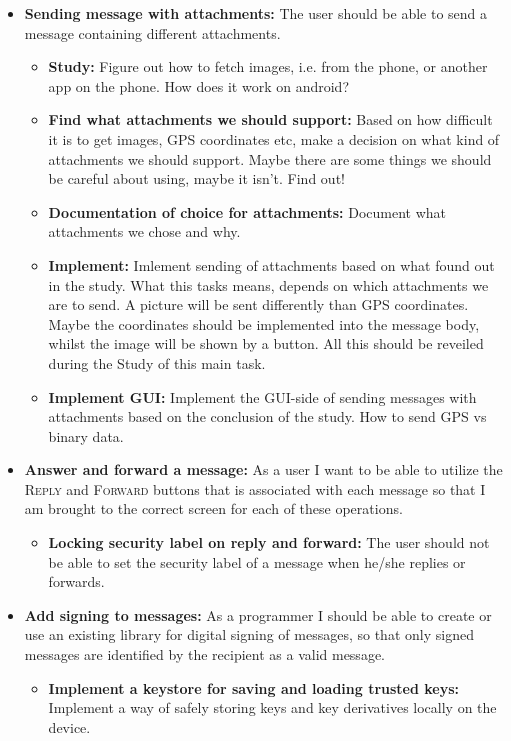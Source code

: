 \begin{itemize}
\begin{itemize}
\end{itemize}
\item{}\textbf{Sending message with attachments:} The user should be able to send a message containing different attachments.
\begin{itemize}
\item{}\textbf{Study:} Figure out how to fetch images, i.e. from the phone, or another app on the phone. How does it work on android?
\item{}\textbf{Find what attachments we should support:} Based on how difficult it is to get images, GPS coordinates etc, make a decision on what kind of attachments we should support. Maybe there are some things we should be careful about using, maybe it isn't. Find out!
\item{}\textbf{Documentation of choice for attachments:} Document what attachments we chose and why.
\item{}\textbf{Implement:} Imlement sending of attachments based on what found out in the study. What this tasks means, depends on which attachments we are to send. A picture will be sent differently than GPS coordinates. Maybe the coordinates should be implemented into the message body, whilst the image will be shown by a button. All this should be reveiled during the Study of this main task. 
\item{}\textbf{Implement GUI:} Implement the GUI-side of sending messages with attachments based on the conclusion of the study. How to send GPS vs binary data.
\end{itemize}
\item{}\textbf{Answer and forward a message:} As a user I want to be able to utilize the \textsc{Reply} and \textsc{Forward} buttons that is associated with each message so that I am brought to the correct screen for each of these operations.
\begin{itemize}
\item{}\textbf{Locking security label on reply and forward:} The user should not be able to set the security label of a message when he/she replies or forwards.
\end{itemize}
\item{}\textbf{Add signing to messages:} As a programmer I should be able to create or use an existing library for digital signing of messages, so that only signed messages are identified by the recipient as a valid message.
\begin{itemize}
\item{}\textbf{Implement a keystore for saving and loading trusted keys:} Implement a way of safely storing keys and key derivatives locally on the device. 

\end{itemize}
\end{itemize}
